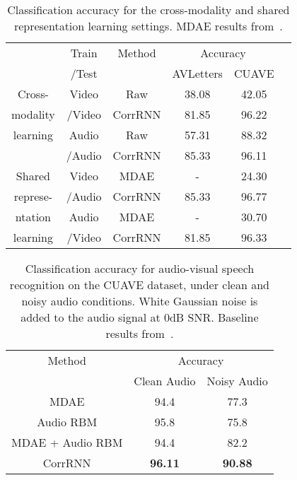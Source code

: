 \documentclass[10pt,twocolumn,letterpaper]{article}
\begin{document}
\begin{table}
\begin{center}
\begin{tabular}{|c||c||c||c||c|c|}
\hline
 & Train & Method &\multicolumn{2}{c|}{Accuracy} \\
\cline{4-5}
       &   /Test    & & AVLetters & CUAVE \\
\hline
Cross- &Video & Raw& 38.08& 42.05\\
\cline{3-5}
modality&/Video & CorrRNN& 81.85& 96.22\\
\cline{2-5}
learning & Audio& Raw&57.31 & 88.32\\
\cline{3-5}
& /Audio&CorrRNN &85.33 & 96.11\\
\hline
\hline
Shared& Video& MDAE& -&24.30\\
\cline{3-5}
represe-& /Audio&CorrRNN &85.33 &96.77\\
\cline{2-5}
ntation & Audio& MDAE&- &30.70 \\
\cline{3-5}
learning& /Video&CorrRNN &81.85 & 96.33\\
\hline
\end{tabular}
\end{center}
\caption{Classification accuracy for the cross-modality and shared representation learning settings. MDAE results from~\cite{ngiam2011multimodal}.}
\label{tbl:audio-visual2}
\end{table}

\begin{table}
\begin{center}

\begin{tabular}{|c|c|c|}
\hline
Method & \multicolumn{2}{c|}{Accuracy } \\
\cline{2-3}
& Clean Audio & Noisy Audio \\
\hline
MDAE & 94.4 & 77.3 \\
\hline
Audio RBM & 95.8& 75.8\\
\hline
MDAE + Audio RBM & 94.4 & 82.2 \\ 
\hline
CorrRNN & \textbf{96.11} & \textbf{90.88} \\
\hline
\end{tabular}
\end{center}
\caption{Classification accuracy for audio-visual speech recognition on the CUAVE dataset, under clean and noisy audio conditions. White Gaussian noise is added to the audio signal at 0dB SNR. Baseline results from~\cite{ngiam2011multimodal}.}
\label{tbl:audio-visual3}
\end{table}
\end{document}
